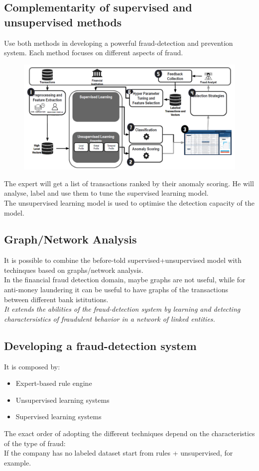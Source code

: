     \subsection{Complementarity of supervised and unsupervised methods }
        Use both methods in developing a powerful fraud-detection and prevention system. Each method focuses on different aspects of fraud.
        \begin{figure}[ht!]
            \centering
            \includegraphics[width=0.6\linewidth]{complementarity.png}
        \end{figure}
        The expert will get a list of transactions ranked by their anomaly scoring. He will analyse, label and use them to tune the supervised learning model.\\
        The unsupervised learning model is used to optimise the detection capacity of the model.
    \subsection{Graph/Network Analysis}
        It is possible to combine the before-told supervised+unsupervised model with techinques based on graphs/network analysis.\\
        In the financial fraud detection domain, maybe graphs are not useful, while for anti-money laundering it can be useful to have graphs of the transactions between different bank istitutions.\\ 
        \textit{It extends the abilities of the fraud-detection system by learning and detecting charactersistics of fraudulent behavior in a network of linked entities.}
    \subsection{Developing a fraud-detection system}
        It is composed by:
        \begin{itemize}
            \item Expert-based rule engine
            \item Unsupervised learning systems
            \item Supervised learning systems
        \end{itemize}
        The exact order of adopting the different techniques depend on the characteristics of the type of fraud:\\
        If the company has no labeled dataset start from rules + unsupervised, for example.
